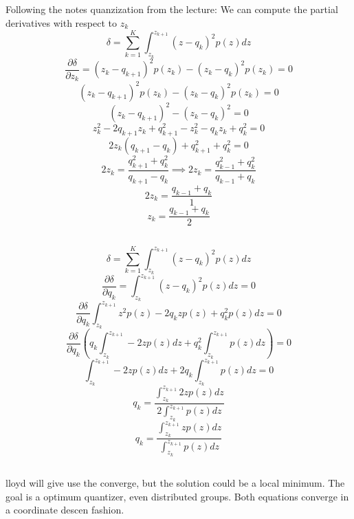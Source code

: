 \documentclass[12pt]{article}
\begin{document}
\subsection{}
Following the notes quanzization from the lecture: We can compute the partial derivatives with respect to $z_{k}$
\[ \delta = \sum_{k=1}^{K} \int_{z_{k}}^{z_{k+1}} (z-q_{k})^2p(z) dz  \]
\[ \frac{\partial \delta}{\partial z_{k}} = (z_{k} - q_{k+1})^2 p(z_{k}) - (z_{k} - q_{k})^2 p(z_{k}) = 0\]
\[ (z_{k} - q_{k+1})^2 p(z_{k}) - (z_{k} - q_{k})^2 p(z_{k}) = 0\]
\[ (z_{k} - q_{k+1})^2 - (z_{k} - q_{k})^2 = 0\]
\[ z_{k}^2 - 2 q_{k+1} z_{k} + q_{k+1}^2 - z_{k}^2 - q_{k}z_{k} + q_{k}^2 = 0\]
\[ 2 z_{k} ( q_{k+1} - q_{k} ) + q_{k+1}^2 + q_{k}^2 = 0\]
\[ 2 z_{k} = \frac{q_{k+1}^2 + q_{k}^2}{q_{k+1} - q_{k}} \implies 2 z_{k} = \frac{q_{k-1}^2 + q_{k}^2}{q_{k-1} + q_{k}} \]
\[ 2 z_{k} = \frac{q_{k-1} + q_{k}}{1} \]
\[ z_{k} = \frac{q_{k-1} + q_{k}}{2} \]
\subsection{}
\[ \delta = \sum_{k=1}^{K} \int_{z_{k}}^{z_{k+1}} (z-q_{k})^2p(z) dz  \]
\[ \frac{\partial \delta}{\partial q_{k}} = \int_{z_{k}}^{z_{k+1}} (z-q_{k})^2p(z) dz = 0\]
\[ \frac{\partial \delta}{\partial q_{k}} \int_{z_{k}}^{z_{k+1}} z^2 p(z) - 2q_{k}z p(z)  + q_{k}^2 p(z) dz = 0\]
\[ \frac{\partial \delta}{\partial q_{k}} (q_{k} \int_{z_{k}}^{z_{k+1}} - 2z p(z) dz + q_{k}^2 \int_{z_{k}}^{z_{k+1}} p(z) dz) = 0\]
\[ \int_{z_{k}}^{z_{k+1}} - 2z p(z) dz + 2q_{k} \int_{z_{k}}^{z_{k+1}} p(z) dz = 0\]
\[ q_{k} = \frac{\int_{z_{k}}^{z_{k+1}} 2z p(z) dz} {2 \int_{z_{k}}^{z_{k+1}} p(z) dz}\]
\[ q_{k} = \frac{\int_{z_{k}}^{z_{k+1}} z p(z) dz}{\int_{z_{k}}^{z_{k+1}} p(z) dz}\]

\subsection{}
lloyd  will give use the converge, but the solution could be a local minimum. The goal is a optimum quantizer, even distributed groups.
Both equations converge in a coordinate descen fashion.
\end{document}
